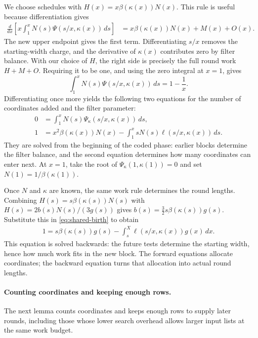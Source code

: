 \documentclass[runningheads,envcountsame,envcountsect,orivec]{llncs}
\begin{document}
We choose schedules with $H(x)=x\beta(\kappa(x))N(x)$.
This rule is useful because differentiation gives
\begin{align*}
 \frac{d}{dx}\left[x\int_1^x
       N(s)\Psi(s/x,\kappa(x))\,ds\right]
 &=x\beta(\kappa(x))N(x)+M(x)+O(x).
\end{align*}
The new upper endpoint gives the first term. Differentiating
$s/x$ removes the starting-width charge, and the derivative
of $\kappa(x)$ contributes zero by filter balance. With our
choice of $H$, the right side is precisely the full round
work $H+M+O$. Requiring it to be one, and using the zero
integral at $x=1$, gives
\[
 \int_1^xN(s)\Psi(s/x,\kappa(x))\,ds=1-\frac1x.
\]
Differentiating once more yields the following two equations
for the number of coordinates added and the filter parameter:
\begin{subequations}
\label{eq:shared-forward}
\begin{align}
 0&=\int_1^xN(s)\Psi_\kappa(s/x,\kappa(x))\,ds,
 \label{eq:shared-cap}\\
 1&=x^2\beta(\kappa(x))N(x)
       -\int_1^x sN(s)\ell(s/x,\kappa(x))\,ds .
 \label{eq:shared-adjoint}
\end{align}
\end{subequations}
They are solved from the beginning of the coded phase:
earlier blocks determine the filter balance, and the second
equation determines how many coordinates can enter next.
At $x=1$, take the root of
$\Psi_\kappa(1,\kappa(1))=0$ and set
$N(1)=1/\beta(\kappa(1))$.

Once $N$ and $\kappa$ are known, the same work rule determines
the round lengths. Combining
$H(s)=s\beta(\kappa(s))N(s)$ with
$H(s)=2b(s)N(s)/(3g(s))$ gives
$b(s)=\tfrac32s\beta(\kappa(s))g(s)$.
Substitute this in \eqref{eq:shared-birth} to obtain
\begin{align}
 1=s\beta(\kappa(s))g(s)
       -\int_s^X\ell(s/x,\kappa(x))g(x)\,dx .
 \label{eq:shared-clock}
\end{align}
This equation is solved backwards: the future tests determine
the starting width, hence how much work fits in the new block.
The forward equations allocate coordinates; the backward
equation turns that allocation into actual round lengths.

\paragraph{Counting coordinates and keeping enough rows.}
The next lemma counts coordinates and keeps enough rows to supply
later rounds, including those whose lower search overhead allows
larger input lists at the same work budget.
\end{document}
